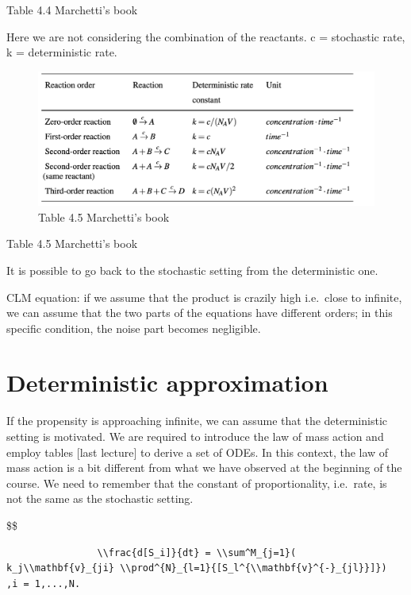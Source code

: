 Table 4.4 Marchetti's book

Here we are not considering the combination of the reactants. c =
stochastic rate, k = deterministic rate.

\begin{figure}
\centering
\includegraphics{05_images/reaction_rates.png}
\caption{Table 4.5 Marchetti's book}
\end{figure}

Table 4.5 Marchetti's book

It is possible to go back to the stochastic setting from the
deterministic one.

CLM equation: if we assume that the product is crazily high i.e.~close
to infinite, we can assume that the two parts of the equations have
different orders; in this specific condition, the noise part becomes
negligible.

\hypertarget{deterministic-approximation}{%
\section{Deterministic
approximation}\label{deterministic-approximation}}

If the propensity is approaching infinite, we can assume that the
deterministic setting is motivated. We are required to introduce the law
of mass action and employ tables {[}last lecture{]} to derive a set of
ODEs. In this context, the law of mass action is a bit different from
what we have observed at the beginning of the course. We need to
remember that the constant of proportionality, i.e.~rate, is not the
same as the stochastic setting.

\$\$

\begin{verbatim}
                \\frac{d[S_i]}{dt} = \\sum^M_{j=1}(                  k_j\\mathbf{v}_{ji} \\prod^{N}_{l=1}{[S_l^{\\mathbf{v}^{-}_{jl}}]})            ,i = 1,...,N.
\end{verbatim}

